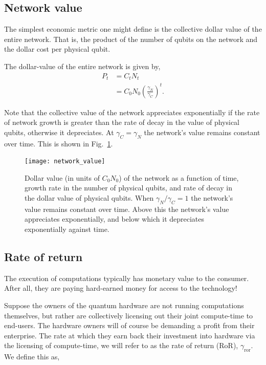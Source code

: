 %
%

\subsection{Network value}\label{sec:network_value}

The simplest economic metric one might define is the collective dollar value of the entire network. That is, the product of the number of qubits on the network and the dollar cost per physical qubit.

\begin{postulate}\label{post:network_value}
The dollar-value of the entire network is given by,
\begin{align}
	P_t &= C_t N_t \nonumber \\
	&= C_0 N_0 \left(\frac{\gamma_N}{\gamma_C}\right)^t.
\end{align}
\end{postulate}

Note that the collective value of the network appreciates exponentially if the rate of network growth is greater than the rate of decay in the value of physical qubits, otherwise it depreciates. At \mbox{$\gamma_C=\gamma_N$} the network's value remains constant over time. This is shown in Fig.~\ref{fig:network_value}.

\begin{figure}[!htb]
	\texttt{[image: network\_value]}
	\caption{Dollar value (in units of \mbox{$C_0N_0$}) of the network as a function of time, growth rate in the number of physical qubits, and rate of decay in the dollar value of physical qubits. When \mbox{$\gamma_N/\gamma_C=1$} the network's value remains constant over time. Above this the network's value appreciates exponentially, and below which it depreciates exponentially against time.} \label{fig:network_value}
\end{figure}

%
%

\subsection{Rate of return}

The execution of computations typically has monetary value to the consumer. After all, they are paying hard-earned money for access to the technology!

Suppose the owners of the quantum hardware are not running computations themselves, but rather are collectively licensing out their joint compute-time to end-users. The hardware owners will of course be demanding a profit from their enterprise. The rate at which they earn back their investment into hardware via the licensing of compute-time, we will refer to as the rate of return (RoR), $\gamma_\text{ror}$. We define this as,


